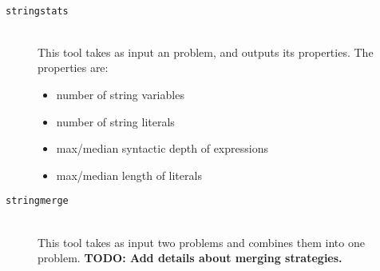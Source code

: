 \begin{description}
            \hfill \\

        \item[\texttt{stringstats}] \hfill \\
            This tool takes as input an \smt{} problem, and outputs its properties. The properties are:

            \begin{itemize}
                \item number of string variables
                \item number of string literals
                \item max/median syntactic depth of expressions
                \item max/median length of literals
            \end{itemize}

            \hfill

        \item[\texttt{stringmerge}] \hfill \\
            This tool takes as input two \smt{} problems and combines them into one problem. \textbf{TODO: Add details about merging strategies.}

    \end{description}
